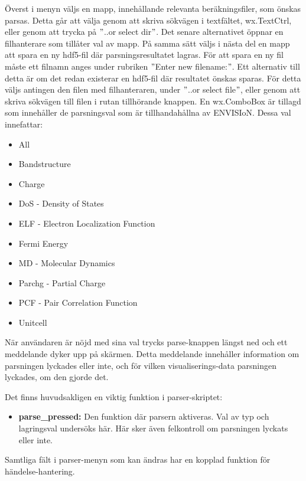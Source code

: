 Överst i menyn väljs en mapp, innehållande relevanta beräkningsfiler, som önskas parsas. Detta går att välja genom att skriva sökvägen i textfältet, wx.TextCtrl, eller genom att trycka på $"$..or select dir$"$. Det senare alternativet öppnar en filhanterare som tillåter val av mapp.
På samma sätt väljs i nästa del en mapp att spara en ny hdf5-fil där parsningsresultatet lagras. För att spara en ny fil måste ett filnamn anges under rubriken $"$Enter new filename:$"$. Ett alternativ till detta är om det redan existerar en hdf5-fil där resultatet önskas sparas. För detta väljs antingen den filen med filhanteraren, under $"$..or select file$"$, eller genom att skriva sökvägen till filen i rutan tillhörande knappen.
En wx.ComboBox är tillagd som innehåller de parsningsval som är tillhandahållna av ENVISIoN. Dessa val innefattar:

\begin{itemize}
    \setlength\itemsep{0em}
    \item All
    \item Bandstructure
    \item Charge
    \item DoS - Density of States
    \item ELF - Electron Localization Function
    \item Fermi Energy
    \item MD - Molecular Dynamics
    \item Parchg - Partial Charge
    \item PCF - Pair Correlation Function
    \item Unitcell
\end{itemize}

När användaren är nöjd med sina val trycks parse-knappen längst ned och ett meddelande dyker upp på skärmen. Detta meddelande innehåller information om parsningen lyckades eller inte, och för vilken visualiserings-data parsningen lyckades, om den gjorde det.

\newpage

Det finns huvudsakligen en viktig funktion i parser-skriptet:

\begin{itemize}
    \item \textbf{parse\_pressed: }Den funktion där parsern aktiveras. Val av typ och lagringsval undersöks här. Här sker även felkontroll om parsningen lyckats eller inte.
\end{itemize}

Samtliga fält i parser-menyn som kan ändras har en kopplad funktion för händelse-hantering.

